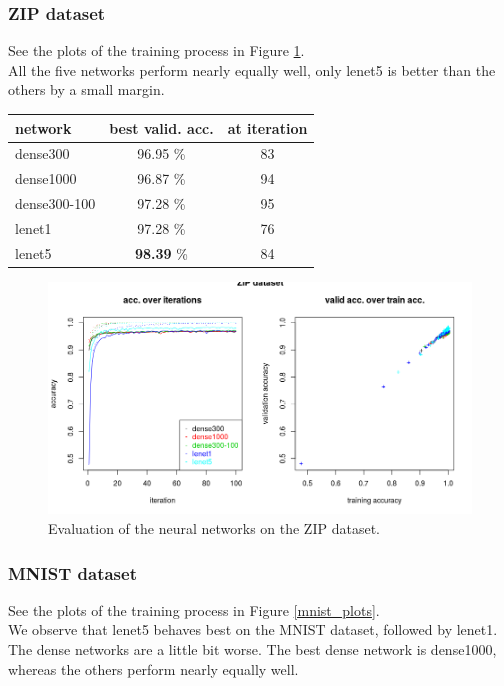 \subsubsection{ZIP dataset}

See the plots of the training process in Figure \ref{zip_plots}.\\
All the five networks perform nearly equally well, only lenet5 is better than the others by a small margin.

\begin{tabular}{|l|c|c|}
 \hline
 network & best valid. acc. & at iteration\\ \hline
 dense300 & 96.95 \% & 83\\
 dense1000 & 96.87 \% & 94\\
 dense300-100 & 97.28 \% & 95\\
 lenet1 & 97.28 \% & 76\\
 lenet5 & \textbf{98.39} \% & 84\\
 \hline
\end{tabular}

\begin{figure}
 \includegraphics[width=\textwidth]{../plots/nn_zip}
 \caption{Evaluation of the neural networks on the ZIP dataset.}
 \label{zip_plots}
\end{figure}


\subsubsection{MNIST dataset}

See the plots of the training process in Figure \ref{mnist_plots}.\\
We observe that lenet5 behaves best on the MNIST dataset,
followed by lenet1.\\
The dense networks are a little bit worse.
The best dense network is dense1000, whereas the others perform nearly equally well.\\

